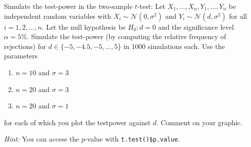 
\begin{exercise}

Simulate the test-power in the two-sample $t$-test: Let $X_1,\dots,X_n,Y_1,\dots,Y_n$
be independent random variables with $X_i \sim \mathcal{N}(0,\sigma^2)$ and
$Y_i \sim \mathcal{N}(d,\sigma^2)$ for all $i = 1,2,\dots,n$.
Let the null hypothesis be $H_0: d = 0$ and the significance level $\alpha = 5\%$.
Simulate the test-power (by computing the relative frequency of rejections)
for $d \in \{-5,-4.5,-5,\dots,5\}$ in 1000 simulations each.
Use the parameters

\begin{enumerate}[label = (\alph*)]
  \item $n = 10$ and $\sigma = 3$
  \item $n = 20$ and $\sigma = 3$
  \item $n = 20$ and $\sigma = 1$
\end{enumerate}

for each of which you plot the testpower against $d$. Comment on your graphic.

\textit{Hint:} You can access the $p$-value with \texttt{t.test()\$p.value}.
\end{exercise}


\begin{solution}

\phantom{}

\end{solution}

